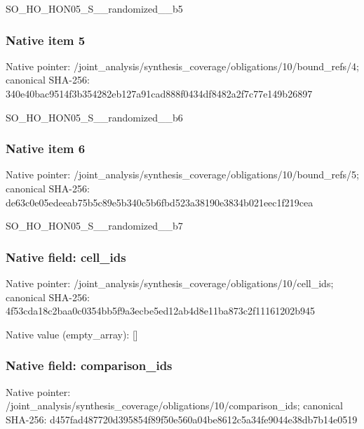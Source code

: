 \documentclass[10pt,a4paper]{article}
\begin{document}
\begingroup\raggedright\sloppy SO\_\allowbreak{}HO\_\allowbreak{}HON05\_\allowbreak{}S\_\allowbreak{}\_\allowbreak{}randomized\_\allowbreak{}\_\allowbreak{}b5\par\endgroup

\subsubsection{Native item 5}
Native pointer: /joint\_\allowbreak{}analysis/synthesis\_\allowbreak{}coverage/obligations/10/bound\_\allowbreak{}refs/4; canonical SHA-256: 340e40bac9514f3b354282eb127a91cad888f0434df8482a2f7c77e149b26897

\begingroup\raggedright\sloppy SO\_\allowbreak{}HO\_\allowbreak{}HON05\_\allowbreak{}S\_\allowbreak{}\_\allowbreak{}randomized\_\allowbreak{}\_\allowbreak{}b6\par\endgroup

\subsubsection{Native item 6}
Native pointer: /joint\_\allowbreak{}analysis/synthesis\_\allowbreak{}coverage/obligations/10/bound\_\allowbreak{}refs/5; canonical SHA-256: de63c0e05edeeab75b5c89e5b340c5b6fbd523a38190e3834b021eec1f219cea

\begingroup\raggedright\sloppy SO\_\allowbreak{}HO\_\allowbreak{}HON05\_\allowbreak{}S\_\allowbreak{}\_\allowbreak{}randomized\_\allowbreak{}\_\allowbreak{}b7\par\endgroup

\subsubsection{Native field: cell\_\allowbreak{}ids}
Native pointer: /joint\_\allowbreak{}analysis/synthesis\_\allowbreak{}coverage/obligations/10/cell\_\allowbreak{}ids; canonical SHA-256: 4f53cda18c2baa0c0354bb5f9a3ecbe5ed12ab4d8e11ba873c2f11161202b945

Native value (empty\_\allowbreak{}array): []

\subsubsection{Native field: comparison\_\allowbreak{}ids}
Native pointer: /joint\_\allowbreak{}analysis/synthesis\_\allowbreak{}coverage/obligations/10/comparison\_\allowbreak{}ids; canonical SHA-256: d457fad487720d395854f89f50e560a04be8612c5a34fe9044e38db7b14e0519
\end{document}
